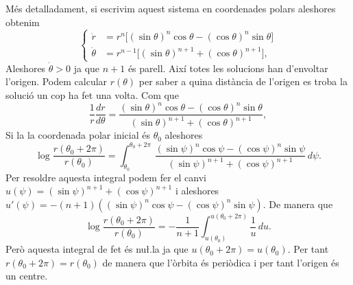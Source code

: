 \documentclass[12pt]{report}
\numberwithin{table}{section}
\numberwithin{equation}{section}
\numberwithin{figure}{section}
\begin{document}
\begin{enumerate}[label=(\roman*), font=\bfseries \sffamily, wide, labelwidth=!, labelindent=0pt]
		Més detalladament, si escrivim aquest sistema en coordenades polars aleshores obtenim 
		\begin{equation*}
			\left\{ 
				\begin{aligned}
					\dot{r} & = r^n \big[(\sin{\theta})^n \cos{\theta} - (\cos{\theta})^n \sin{\theta}\big] \\
					\dot{\theta} & = r^{n-1}\big[(\sin{\theta})^{n+1}  + (\cos{\theta})^{n+1} \big],
				\end{aligned} 
			\right. 
		\end{equation*}
		Aleshores \( \dot{\theta} > 0 \) ja que \( n+1 \) és parell. Així totes les solucions han d'envoltar l'origen. Podem calcular \( r(\theta) \) per saber a quina distància de l'origen es troba la solució un cop ha fet una volta. Com que
		\begin{equation*}
		\frac{1}{r}\frac{dr}{d\theta} = \frac{(\sin{\theta})^n \cos{\theta} - (\cos{\theta})^n \sin{\theta}}{(\sin{\theta})^{n+1}  + (\cos{\theta})^{n+1} },
		\end{equation*}
	Si la la coordenada polar inicial és \( \theta_0 \) aleshores
	\begin{equation*}
		\log{\frac{r(\theta_0 + 2\pi)}{r(\theta_0)}} = \int_{\theta_0}^{\theta_0 + 2\pi} \, \frac{(\sin{\psi})^n \cos{\psi} - (\cos{\psi})^n \sin{\psi}}{(\sin{\psi})^{n+1}  + (\cos{\psi})^{n+1} } \, d \psi.
	\end{equation*}
	Per resoldre aquesta integral podem fer el canvi \( u(\psi) = (\sin{\psi})^{n+1}  + (\cos{\psi})^{n+1} \)	i aleshores \( u'(\psi) = -(n+1)\left((\sin{\psi})^n \cos{\psi} - (\cos{\psi})^n \sin{\psi}\right) \). De manera que
	\begin{equation*}
	\log{\frac{r(\theta_0 + 2\pi)}{r(\theta_0)}} = - \frac{1}{n+1} \int_{u(\theta_0)}^{u(\theta_0 + 2\pi)} \frac{1}{u} \, du. 
	\end{equation*}
	Però aquesta integral de fet és nu\l.la ja que \( u(\theta_0 + 2\pi) = u(\theta_0) \). Per tant \( r(\theta_0 + 2\pi) = r(\theta_0) \) de manera que l'òrbita és periòdica i per tant l'origen és un centre. 	
	


\end{enumerate}
\end{document}
